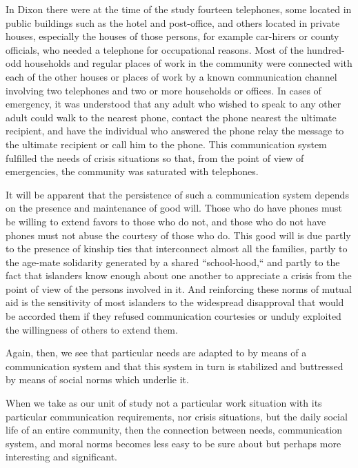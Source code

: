 \documentclass[openany,nobib]{tufte-book}
\begin{document}
In Dixon there were at the time of the study fourteen telephones, some
located in public buildings such as the hotel and post-office, and
others located in private houses, especially the houses of those
persons, for example car-hirers or county officials, who needed a
telephone for occupational reasons. Most of the hundred-odd households
and regular places of work in the community were connected with each of
the other houses or places of work by a known communication channel
involving two telephones and two or more households or offices. In cases
of emergency, it was understood that any adult who wished to speak to
any other adult could walk to the nearest phone, contact the phone
nearest the ultimate recipient, and have the individual who answered the
phone relay the message to the ultimate recipient or call him to the
phone. This communication system fulfilled the needs of crisis
situations so that, from the point of view of emergencies, the community
was saturated with telephones.

It will be apparent that the persistence of such a communication system
depends on the presence and maintenance of good will. Those who do have
phones must be willing to extend favors to those who do not, and those
who do not have phones must not abuse the courtesy of those who do. This
good will is due partly to the presence of kinship ties that
interconnect almost all the families, partly to the age-mate solidarity
generated by a shared ``school-hood,`` and partly to the fact that
islanders know enough about one another to appreciate a crisis from the
point of view of the persons involved in it. And reinforcing these norms
of mutual aid is the sensitivity of most islanders to the widespread
disapproval that would be accorded them if they refused communication
courtesies or unduly exploited the willingness of others to extend them.

Again, then, we see that particular needs are adapted to by means of a
communication system and that this system in turn is stabilized and
buttressed by means of social norms which underlie it.

When we take as our unit of study not a particular work situation with
its particular communication requirements, nor crisis situations, but
the daily social life of an entire community, then the connection
between needs, communication system, and moral norms becomes less easy
to be sure about but perhaps more interesting and significant.
\end{document}
